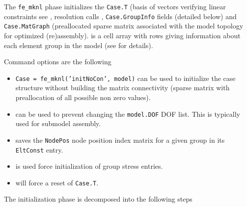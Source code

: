 
The {\tt fe\_mknl}  phase initializes the {\tt Case.T} (basis of vectors verifying linear constraints see , resolution calls , {\tt Case.GroupInfo} fields (detailed below) and {\tt Case.MatGraph} (preallocated sparse matrix associated with the model topology for optimized (re)assembly).  is a cell array with rows giving information about each element group in the model (see  for details). 

Command options are the following
\begin{itemize}
\item {} {\tt Case = fe\_mknl('initNoCon', model)} can be used to initialize the case structure without building the matrix connectivity (sparse matrix with preallocation of all possible non zero values).
\item  {} can be used to prevent changing the {\tt model.DOF} DOF list. This is typically used for submodel assembly.
\item  {} saves the {\tt NodePos} node position index matrix for a given group in its {\tt EltConst} entry. 
\item  {} is used force initialization of group stress entries.
\item  {} will force a reset of {\tt Case.T}.

\end{itemize}

The initialization phase is decomposed into the following steps


